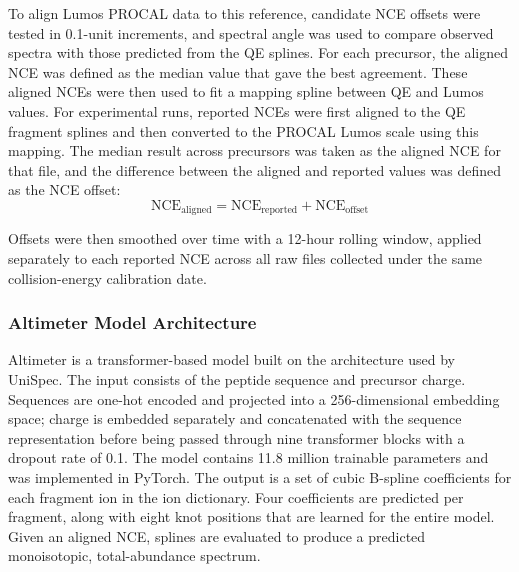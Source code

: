 \documentclass[pdflatex,sn-nature]{sn-jnl}
\begin{document}
To align Lumos PROCAL data to this reference, candidate NCE offsets were tested in 0.1-unit increments, and spectral angle was used to compare observed spectra with those predicted from the QE splines. For each precursor, the aligned NCE was defined as the median value that gave the best agreement. These aligned NCEs were then used to fit a mapping spline between QE and Lumos values.
For experimental runs, reported NCEs were first aligned to the QE fragment splines and then converted to the PROCAL Lumos scale using this mapping. The median result across precursors was taken as the aligned NCE for that file, and the difference between the aligned and reported values was defined as the NCE offset:
\begin{equation} 
    \text{NCE}_{\text{aligned}} = \text{NCE}_{\text{reported}} + \text{NCE}_{\text{offset}}
\end{equation}

Offsets were then smoothed over time with a 12-hour rolling window, applied separately to each reported NCE across all raw files collected under the same collision-energy calibration date.

\subsubsection{Altimeter Model Architecture}\label{subsubsec:altimeter-model-architecture}
Altimeter is a transformer-based model built on the architecture used by UniSpec. The input consists of the peptide sequence and precursor charge. Sequences are one-hot encoded and projected into a 256-dimensional embedding space; charge is embedded separately and concatenated with the sequence representation before being passed through nine transformer blocks with a dropout rate of 0.1. The model contains 11.8 million trainable parameters and was implemented in PyTorch.
The output is a set of cubic B-spline coefficients for each fragment ion in the ion dictionary. Four coefficients are predicted per fragment, along with eight knot positions that are learned for the entire model. Given an aligned NCE, splines are evaluated to produce a predicted monoisotopic, total-abundance spectrum.

\end{document}
